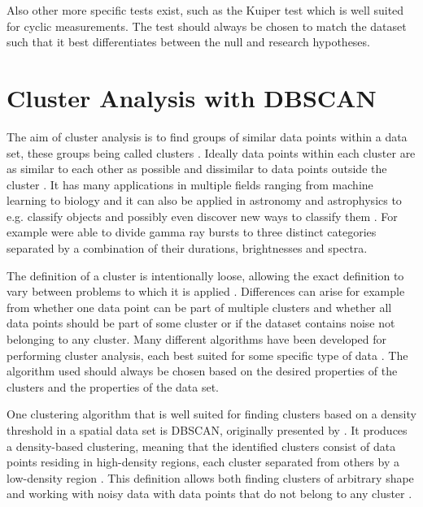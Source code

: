 \documentclass[english, twoside]{HYgradu}
\begin{document}
Also other more specific tests exist, such as the Kuiper test which is well suited for cyclic measurements. The test should always be chosen to match the dataset such that it best differentiates between the null and research hypotheses.

\section{Cluster Analysis with DBSCAN} \label{sect:cluster-analysis}
The aim of cluster analysis is to find groups of similar data points within a data set, these groups being called clusters \citep{han2000data}. Ideally data points within each cluster are as similar to each other as possible and dissimilar to data points outside the cluster \citep{han2000data}. It has many applications in multiple fields ranging from machine learning to biology and it can also be applied in astronomy and astrophysics to e.g. classify objects and possibly even discover new ways to classify them \citep{ball2010data, han2000data}. For example \citet{mukherjee1998three} were able to divide gamma ray bursts to three distinct categories separated by a combination of their durations, brightnesses and spectra.

The definition of a cluster is intentionally loose, allowing the exact definition to vary between problems to which it is applied \citep{tan2006introduction}. Differences can arise for example from whether one data point can be part of multiple clusters and whether all data points should be part of some cluster or if the dataset contains noise not belonging to any cluster. Many different algorithms have been developed for performing cluster analysis, each best suited for some specific type of data \citep{han2000data}. The algorithm used should always be chosen based on the desired properties of the clusters and the properties of the data set.

One clustering algorithm that is well suited for finding clusters based on a density threshold in a spatial data set is DBSCAN, originally presented by \citet{ester1996density}. It produces a density-based clustering, meaning that the identified clusters consist of data points residing in high-density regions, each cluster separated from others by a low-density region \citep{han2000data}. This definition allows both finding clusters of arbitrary shape and working with noisy data with data points that do not belong to any cluster \citep{ester1996density}.
\end{document}
